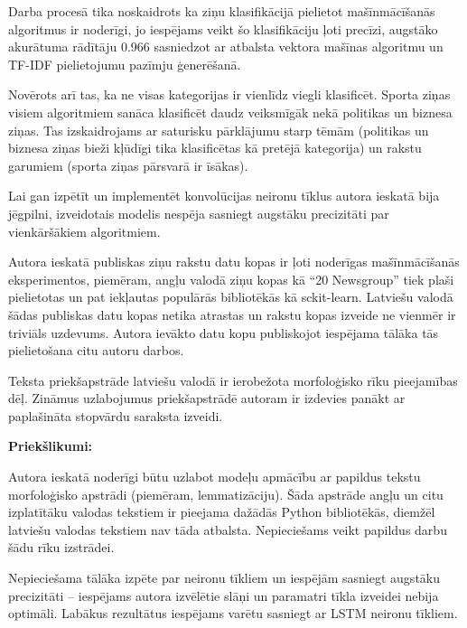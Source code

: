 Darba procesā tika noskaidrots ka ziņu klasifikācijā pielietot mašīnmācīšanās algoritmus ir noderīgi, jo iespējams veikt šo klasifikāciju ļoti precīzi, augstāko akurātuma rādītāju 0.966 sasniedzot ar atbalsta vektora mašīnas algoritmu un TF-IDF pielietojumu pazīmju ģenerēšanā.

Novērots arī tas, ka ne visas kategorijas ir vienlīdz viegli klasificēt. Sporta ziņas visiem algoritmiem sanāca klasificēt daudz veiksmīgāk nekā politikas un biznesa ziņas. Tas izskaidrojams ar saturisku pārklājumu starp tēmām (politikas un biznesa ziņas bieži kļūdīgi tika klasificētas kā pretējā kategorija) un rakstu garumiem (sporta ziņas pārsvarā ir īsākas).

Lai gan izpētīt un implementēt konvolūcijas neironu tīklus autora ieskatā bija jēgpilni, izveidotais modelis nespēja sasniegt augstāku precizitāti par vienkāršākiem algoritmiem.

Autora ieskatā publiskas ziņu rakstu datu kopas ir ļoti noderīgas mašīnmācīšanās eksperimentos, piemēram, angļu valodā ziņu kopas kā “20 Newsgroup” tiek plaši pielietotas un pat iekļautas populārās bibliotēkās kā sckit-learn. Latviešu valodā šādas publiskas datu kopas netika atrastas un rakstu kopas izveide ne vienmēr ir triviāls uzdevums. Autora ievākto datu kopu publiskojot iespējama tālāka tās pielietošana citu autoru darbos.

Teksta priekšapstrāde latviešu valodā ir ierobežota morfoloģisko rīku pieejamības dēļ. Zināmus uzlabojumus priekšapstrādē autoram ir izdevies panākt ar paplašināta stopvārdu saraksta izveidi.

\textbf {Priekšlikumi:}

Autora ieskatā noderīgi būtu uzlabot modeļu apmācību ar papildus tekstu morfoloģisko apstrādi (piemēram, lemmatizāciju). Šāda apstrāde angļu un citu izplatītāku valodas tekstiem ir pieejama dažādās Python bibliotēkās, diemžēl latviešu valodas tekstiem nav tāda atbalsta. Nepieciešams veikt papildus darbu šādu rīku izstrādei.

Nepieciešama tālāka izpēte par neironu tīkliem un iespējām sasniegt augstāku precizitāti – iespējams autora izvēlētie slāņi un paramatri tīkla izveidei nebija optimāli. Labākus rezultātus iespējams varētu sasniegt ar LSTM neironu tīkliem.
